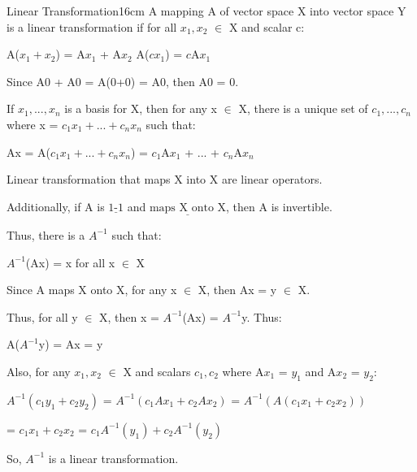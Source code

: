     \begin{definition}{Linear Transformation}{16cm}
        A mapping A of vector space X into vector space Y is
        a {\color{lblue} linear transformation} if for all $x_1,x_2$ $\in$ X
        and scalar c:

        \hspace{0.5cm}
        A($x_1+x_2$) = A$x_1$ + A$x_2$
        \hspace{1cm}
        A($cx_1$) = $c$A$x_1$

        Since A0 + A0 = A(0+0) = A0, then A0 = 0.

        \vspace{0.2cm}

        If $x_1,...,x_n$ is a basis for X, then for any x $\in$ X, there
        is a unique set of $c_1,...,c_n$ where x = $c_1x_1 + ... + c_nx_n$
        such that:

        \hspace{0.5cm}
        Ax = A($c_1x_1 + ... + c_nx_n$)
        = $c_1$A$x_1$ + ... + $c_n$A$x_n$

        \vspace{0.2cm}

        Linear transformation that maps X into X are
        {\color{lblue} linear operators}.

        Additionally, if A is $\underline{\text{1-1}}$ and
        $\underline{\text{maps X onto X}}$,
        then A is {\color{lblue} invertible}.
        
        Thus, there is a $A^{-1}$ such that:

        \hspace{0.5cm}
        $A^{-1}$(Ax) = x
        \hspace{1cm}
        for all x $\in$ X

        Since A maps X onto X, for any x $\in$ X, then Ax = y $\in$ X.

        Thus, for all y $\in$ X, then x = $A^{-1}$(Ax) = $A^{-1}$y. Thus:

        \hspace{0.5cm}
        A($A^{-1}$y) = Ax = y

        Also, for any $x_1,x_2$ $\in$ X and scalars $c_1,c_2$
        where A$x_1$ = $y_1$ and A$x_2$ = $y_2$:

        \hspace{0.5cm}
        $A^{-1}(c_1y_1 + c_2y_2)$
        = $A^{-1}(c_1Ax_1 + c_2Ax_2)$
        = $A^{-1}(A(c_1x_1 + c_2x_2))$

        \hspace{3.6cm}
        = $c_1x_1 + c_2x_2$
        = $c_1A^{-1}(y_1) + c_2A^{-1}(y_2)$

        So, $A^{-1}$ is a linear transformation.
    \end{definition}

